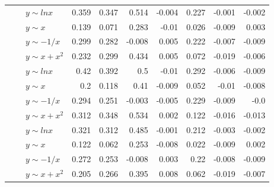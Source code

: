 \begin{table*}[!ht]
\begin{tabular}{| l | l | l | r | r | r | r | r | r | r | }
&\multirow{4}{*}{\metrictwor{}}
&$y\sim lnx$&\cellcolor[rgb]{.7,.7,.7}0.359&\cellcolor[rgb]{.7,.7,.7}0.347&\cellcolor[rgb]{.5,.5,.5}0.514&-0.004&\cellcolor[rgb]{.9,.9,.9}0.227&-0.001&-0.002  \\ \cline{3-10}
&&$y\sim x$&\cellcolor[rgb]{.9,.9,.9}0.139&\cellcolor[rgb]{.9,.9,.9}0.071&\cellcolor[rgb]{.7,.7,.7}0.283&-0.01&\cellcolor[rgb]{.9,.9,.9}0.026&-0.009&\cellcolor[rgb]{.9,.9,.9}0.003  \\ \cline{3-10}
&&$y\sim -1/x$&\cellcolor[rgb]{.7,.7,.7}0.299&\cellcolor[rgb]{.7,.7,.7}0.282&-0.008&\cellcolor[rgb]{.9,.9,.9}0.005&\cellcolor[rgb]{.9,.9,.9}0.222&-0.007&-0.009  \\ \cline{3-10}
&&$y\sim x+x^2$&\cellcolor[rgb]{.9,.9,.9}0.232&\cellcolor[rgb]{.7,.7,.7}0.299&\cellcolor[rgb]{.7,.7,.7}0.434&\cellcolor[rgb]{.9,.9,.9}0.005&\cellcolor[rgb]{.9,.9,.9}0.072&-0.019&-0.006  \\ \cline{2-10}

&\multirow{4}{*}{\metrictwok{}}
&$y\sim lnx$&\cellcolor[rgb]{.7,.7,.7}0.42&\cellcolor[rgb]{.7,.7,.7}0.392&\cellcolor[rgb]{.5,.5,.5}0.5&-0.01&\cellcolor[rgb]{.7,.7,.7}0.292&-0.006&-0.009  \\ \cline{3-10}
&&$y\sim x$&\cellcolor[rgb]{.9,.9,.9}0.2&\cellcolor[rgb]{.9,.9,.9}0.118&\cellcolor[rgb]{.7,.7,.7}0.41&-0.009&\cellcolor[rgb]{.9,.9,.9}0.052&-0.01&-0.008  \\ \cline{3-10}
&&$y\sim -1/x$&\cellcolor[rgb]{.7,.7,.7}0.294&\cellcolor[rgb]{.7,.7,.7}0.251&-0.003&-0.005&\cellcolor[rgb]{.9,.9,.9}0.229&-0.009&-0.0  \\ \cline{3-10}
&&$y\sim x+x^2$&\cellcolor[rgb]{.7,.7,.7}0.312&\cellcolor[rgb]{.7,.7,.7}0.348&\cellcolor[rgb]{.5,.5,.5}0.534&\cellcolor[rgb]{.9,.9,.9}0.002&\cellcolor[rgb]{.9,.9,.9}0.122&-0.016&-0.013  \\ \cline{2-10}

&\multirow{4}{*}{\metrictwop{}}
&$y\sim lnx$&\cellcolor[rgb]{.7,.7,.7}0.321&\cellcolor[rgb]{.7,.7,.7}0.312&\cellcolor[rgb]{.7,.7,.7}0.485&-0.001&\cellcolor[rgb]{.9,.9,.9}0.212&-0.003&-0.002  \\ \cline{3-10}
&&$y\sim x$&\cellcolor[rgb]{.9,.9,.9}0.122&\cellcolor[rgb]{.9,.9,.9}0.062&\cellcolor[rgb]{.7,.7,.7}0.253&-0.008&\cellcolor[rgb]{.9,.9,.9}0.022&-0.009&\cellcolor[rgb]{.9,.9,.9}0.002  \\ \cline{3-10}
&&$y\sim -1/x$&\cellcolor[rgb]{.7,.7,.7}0.272&\cellcolor[rgb]{.7,.7,.7}0.253&-0.008&\cellcolor[rgb]{.9,.9,.9}0.003&\cellcolor[rgb]{.9,.9,.9}0.22&-0.008&-0.009  \\ \cline{3-10}
&&$y\sim x+x^2$&\cellcolor[rgb]{.9,.9,.9}0.205&\cellcolor[rgb]{.7,.7,.7}0.266&\cellcolor[rgb]{.7,.7,.7}0.395&\cellcolor[rgb]{.9,.9,.9}0.008&\cellcolor[rgb]{.9,.9,.9}0.062&-0.019&-0.007  \\ \hline


\end{tabular}
\end{table*}
